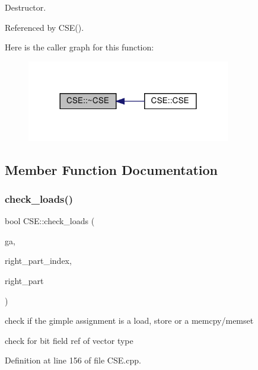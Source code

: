 Destructor. 



Referenced by C\+S\+E().

Here is the caller graph for this function\+:
\nopagebreak
\begin{figure}[H]
\begin{center}
\leavevmode
\includegraphics[width=252pt]{d1/d73/classCSE_ad2908703ed31dbc1be925fba3a6d9367_icgraph}
\end{center}
\end{figure}


\subsection{Member Function Documentation}
\mbox{\label{classCSE_ac4ffe21033c163f44c7117e78da4d50e}} 
\subsubsection{\texorpdfstring{check\+\_\+loads()}{check\_loads()}}
{\footnotesize\ttfamily bool C\+S\+E\+::check\+\_\+loads (\begin{DoxyParamCaption}\item[{const \hyperlink{structgimple__assign}{gimple\+\_\+assign} $\ast$}]{ga,  }\item[{unsigned int}]{right\+\_\+part\+\_\+index,  }\item[{\hyperlink{tree__node_8hpp_a6ee377554d1c4871ad66a337eaa67fd5}{tree\+\_\+node\+Ref}}]{right\+\_\+part }\end{DoxyParamCaption})\hspace{0.3cm}{\ttfamily [private]}}



check if the gimple assignment is a load, store or a memcpy/memset 

check for bit field ref of vector type 

Definition at line 156 of file C\+S\+E.\+cpp.



